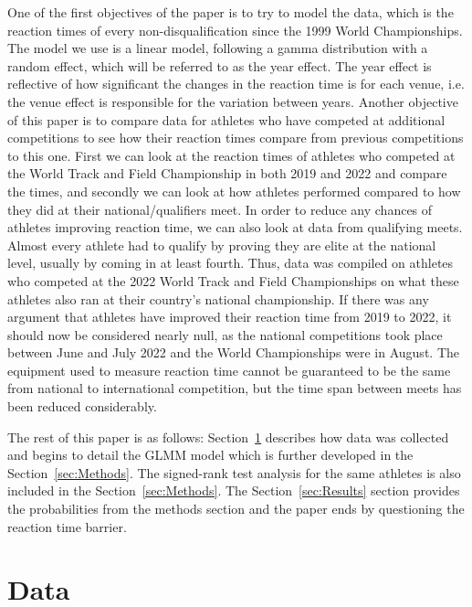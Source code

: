 \documentclass[12pt, letterpaper, titlepage]{article}
\begin{document}

One of the first objectives of the paper is to try to model the data, which is
the reaction times of every non-disqualification since the 1999 World Championships. 
The model we use is a linear model, following a gamma distribution with a random
effect, which will be referred to as the year effect.  The year effect is
reflective of how significant the changes in the reaction time is for each venue,
i.e. the venue effect is  responsible for the variation between years.  
Another objective of this paper is to compare data for athletes who have competed
at additional competitions to see how their reaction times compare from previous
competitions to this one. First we can look at the reaction times of athletes who
competed at the World Track and Field Championship in both 2019 and 2022 and
compare the times, and secondly we can look at how athletes performed compared
to how they did at their national/qualifiers meet. In order to reduce any chances
of athletes improving reaction time, we can also look at data from qualifying meets.
Almost every athlete had to qualify by proving they are elite at the national level, 
usually by coming in at least fourth. Thus, data was compiled on athletes who competed
at the 2022 World Track and Field Championships on what these athletes also ran 
at their country's national championship. If there was any argument that athletes
have improved their reaction time from 2019 to 2022, it should now be considered
nearly null, as the national competitions took place between June and July 2022 
and the World Championships were in August. The equipment used to measure reaction
time cannot be guaranteed to be the same from national to international
competition, but the time span between meets has been reduced considerably.


The rest of this paper is as follows: Section~\ref{sec:Data} describes how data was
collected and begins to detail the GLMM model which is further developed in the
Section~\ref{sec:Methods}.  The signed-rank test analysis for the same athletes is
also included in the Section~\ref{sec:Methods}.  The Section~\ref{sec:Results}
section provides the probabilities from the methods section and the paper ends 
by questioning the reaction time barrier.


\section{Data} \label{sec:Data}
\end{document}
